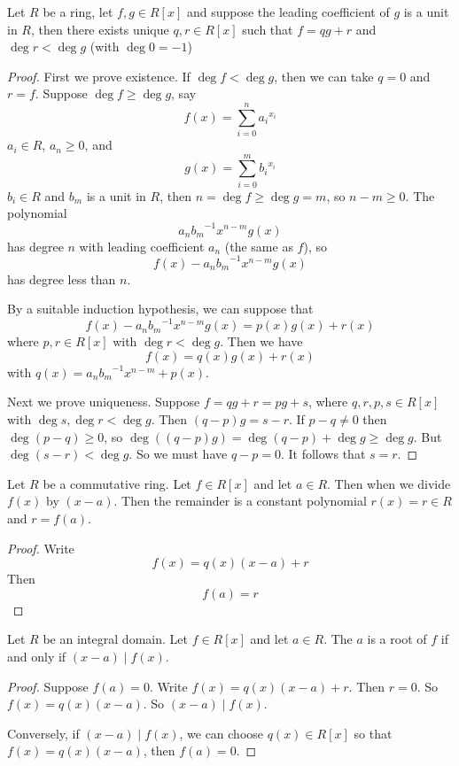 
\begin{thm}
Let $R$ be a ring, let $f,g \in R[x]$ and suppose the leading coefficient of $g$ is a unit in $R$, then there exists unique $q,r\in R[x]$ such that $f = qg + r$ and $\deg r < \deg g$ (with $\deg 0 = -1$)
\end{thm}

\begin{proof}
First we prove existence. If $\deg f < \deg g$, then we can take $q = 0$ and $r=f$. Suppose $\deg f \geq \deg g$, say \[f(x) = \sum_{i=0}^n {a_i}^{x_i}\] $a_i\in R$, $a_n\geq 0$, and \[g(x)=\sum_{i=0}^m {b_i}^{x_i}\] $b_i\in R$ and $b_m$ is a unit in $R$,
then $n = \deg f \geq \deg g = m$, so $n -m \geq 0$. The polynomial
\[a_n{b_m}^{-1}x^{n-m} g(x)\] has degree $n$ with leading coefficient $a_n$ (the same as $f$), so \[f(x) - a_n{b_m}^{-1}x^{n-m} g(x)\] has degree less than $n$.

By a suitable induction hypothesis, we can suppose that \[f(x) - a_n{b_m}^{-1}x^{n-m} g(x)=p(x)g(x) + r(x)\] where $p,r \in R[x]$ with $\deg r < \deg g$. Then we have \[f(x) = q(x)g(x) + r(x)\] with $q(x) = a_n{b_m}^{-1}x^{n-m} + p(x)$.

Next we prove uniqueness.
Suppose $f = qg+r = pg +s$, where $q,r,p,s \in R[x]$ with $\deg s, \deg r < \deg g$.
Then $(q-p)g = s-r$.
If $p-q \neq 0$ then $\deg (p-q) \geq 0$, so $\deg ((q-p)g) = \deg (q-p)+\deg g \geq \deg g$. But $\deg (s-r) < \deg g$. So we must have $q-p = 0$. It follows that $s=r$.
\end{proof}

\begin{thm}
Let $R$ be a commutative ring. Let $f \in R[x]$ and let $a\in R$. Then when we divide $f(x)$ by $(x-a)$. Then the remainder is a constant polynomial $r(x) = r \in R$ and $r = f(a)$.
\end{thm}

\begin{proof}
Write \[f(x) = q(x) (x-a) + r\] Then \[f(a) = r\]
\end{proof}

\begin{thm}
Let $R$ be an integral domain. Let $f \in R[x]$ and let $a\in R$. The $a$ is a root of $f$ if and only if $(x-a) \mid f(x)$.
\end{thm}

\begin{proof}
Suppose $f(a) = 0$. Write $f(x) = q(x)(x-a) + r$. Then $r=0$. So $f(x) = q(x)(x-a)$. So $(x-a) \mid f(x)$. 

Conversely, if $(x-a)\mid f(x)$, we can choose $q(x) \in R[x]$ so that $f(x) = q(x) (x-a)$, then $f(a) = 0$.
\end{proof} 

